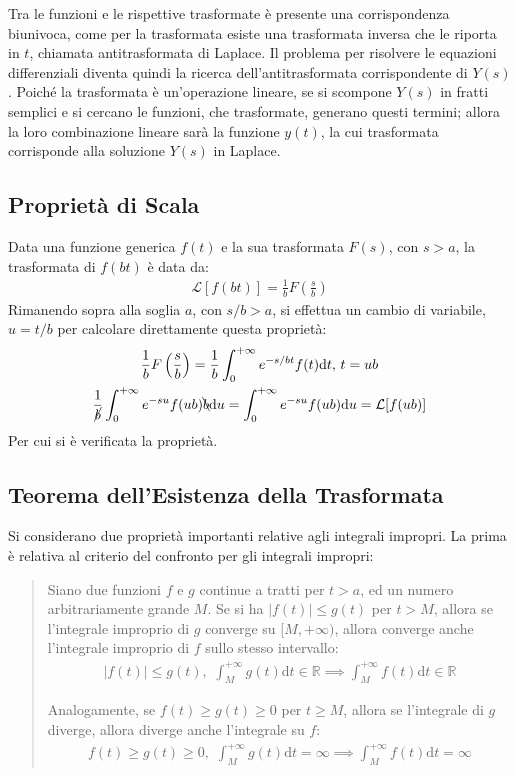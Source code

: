 \documentclass{article}
\newcommand{\df}{\mathrm{d}}
\newcommand{\intab}[4]{\displaystyle\int_{#1}^{#2}{#3}\df{#4}}
\newcommand{\intpinf}[2]{\intab{0}{+\infty}{#1}{#2}}
\numberwithin{equation}{subsection}
\begin{document}
Tra le funzioni e le rispettive trasformate è presente una corrispondenza biunivoca, come per la trasformata esiste una trasformata inversa che le riporta in $t$, chiamata antitrasformata di Laplace. Il problema per risolvere le equazioni differenziali diventa quindi la ricerca dell'antitrasformata corrispondente di $Y(s)$. 
Poiché la trasformata è un'operazione lineare, se si scompone $Y(s)$ in fratti semplici e si cercano le funzioni, che trasformate, generano questi termini; allora la loro combinazione lineare sarà la funzione $y(t)$, la cui trasformata corrisponde alla soluzione $Y(s)$ in Laplace. 

\subsection{Proprietà di Scala}

Data una funzione generica $f(t)$ e la sua trasformata $F(s)$, con $s>a$, la trasformata di $f(bt)$ è data da:
\begin{gather}
    \mathcal{L}[f(bt)]=\frac{1}{b}F\left(\frac{s}{b}\right)
\end{gather}
Rimanendo sopra alla soglia $a$, con $s/b>a$, si effettua un cambio di variabile, $u=t/b$ per calcolare direttamente questa proprietà:
\begin{gather*}
    \frac{1}{b}F\left(\frac{s}{b}\right)=\frac{1}{b}\intpinf{e^{-s/bt}f(t)}{t},\,t=ub\\
    \frac{1}{\cancel{b}}\intpinf{e^{-su}f(ub)\bcancel{b}}{u}=\intpinf{e^{-su}f(ub)}{u}=\mathcal{L}[f(ub)]
\end{gather*}
Per cui si è verificata la proprietà. 

\subsection{Teorema dell'Esistenza della Trasformata}

Si considerano due proprietà importanti relative agli integrali impropri. La prima è relativa al criterio del confronto per gli integrali impropri:
\begin{quotation}
    Siano due funzioni $f$ e $g$ continue a tratti per $t>a$, ed un numero arbitrariamente grande $M$. Se si ha $|f(t)|\leq g(t)$ per $t>M$, allora se l'integrale improprio di $g$ converge su $[M,+\infty)$, allora converge anche l'integrale improprio di $f$ sullo stesso intervallo:
    \begin{gather*}
        |f(t)|\leq g(t),\,\,\int_M^{+\infty}g(t)\df t\in\mathbb{R}\implies\int_M^{+\infty}f(t)\df t\in\mathbb{R}
    \end{gather*}

    Analogamente, se $f(t)\geq g(t)\geq0$ per $t\geq M$, allora se l'integrale di $g$ diverge, allora diverge anche l'integrale su $f$:
    \begin{gather*}
        f(t)\geq g(t)\geq0,\,\,\int_M^{+\infty}g(t)\df t=\infty\implies\int_M^{+\infty}f(t)\df t=\infty
    \end{gather*} 
\end{quotation}
\end{document}
